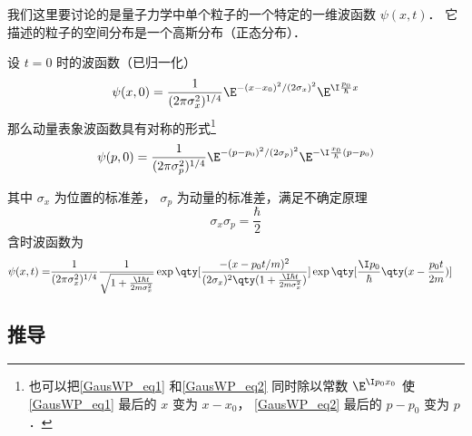 
\begin{issues}
\issueAbstract
\issueTODO
\end{issues}



我们这里要讨论的是量子力学中单个粒子的一个特定的一维波函数 $\psi(x,t)$． 它描述的粒子的空间分布是一个高斯分布（正态分布）．

设 $t = 0$ 时的波函数（已归一化）
\begin{equation}\label{GausWP_eq1}
\psi (x,0) = \frac{1}{(2\pi\sigma_x ^2)^{1/4}} \E^{-(x - x_0)^2/(2\sigma_x)^2} \E^{\I \frac{p_0}{\hbar}x}
\end{equation}
那么动量表象波函数具有对称的形式\footnote{也可以把\autoref{GausWP_eq1} 和\autoref{GausWP_eq2} 同时除以常数 $\E^{\I p_0 x_0}$ 使\autoref{GausWP_eq1} 最后的 $x$ 变为 $x-x_0$， \autoref{GausWP_eq2} 最后的 $p-p_0$ 变为 $p$． }%
\begin{equation}\label{GausWP_eq2}
\psi (p,0) = \frac{1}{(2\pi\sigma_p^2)^{1/4}} \E^{-(p - p_0)^2/(2\sigma_p)^2} \E^{-\I\frac{x_0}{\hbar }(p - p_0)}
\end{equation}

其中 $\sigma_x$ 为位置的标准差， $\sigma_p$ 为动量的标准差，满足不确定原理
\begin{equation}
\sigma_x\sigma_p = \frac{\hbar}{2}
\end{equation}
含时波函数为
\begin{equation}\begin{aligned}
\psi (x,t) = &\frac{1}{(2\pi\sigma_x^2)^{1/4}} \frac{1}{\sqrt{1 + \frac{\I\hbar t}{2m \sigma_x^2}}}
\exp\qty[\frac{-(x - p_0 t/m)^2}{(2\sigma_x )^2 \qty(1 + \frac{\I\hbar t}{2m \sigma_x^2})}] \exp\qty[\frac{\I p_0}{\hbar } \qty(x - \frac{p_0 t}{2m})]
\end{aligned}\end{equation}

\subsection{推导}




